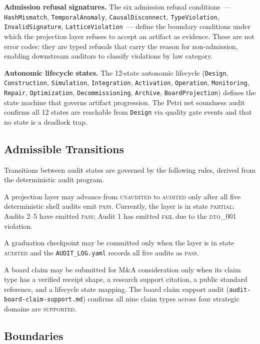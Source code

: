 \textbf{Admission refusal signatures.} The six admission refusal conditions~---
\texttt{HashMismatch}, \texttt{TemporalAnomaly}, \texttt{CausalDisconnect},
\texttt{TypeViolation}, \texttt{InvalidSignature}, \texttt{LatticeViolation}~---
define the boundary conditions under which the projection layer refuses to accept
an artifact as evidence. These are not error codes: they are typed refusals that
carry the reason for non-admission, enabling downstream auditors to classify
violations by law category.

\textbf{Autonomic lifecycle states.} The 12-state autonomic lifecycle
(\texttt{Design}, \texttt{Construction}, \texttt{Simulation},
\texttt{Integration}, \texttt{Activation}, \texttt{Operation},
\texttt{Monitoring}, \texttt{Repair}, \texttt{Optimization},
\texttt{Decommissioning}, \texttt{Archive}, \texttt{BoardProjection}) defines the
state machine that governs artifact progression. The Petri net soundness audit
confirms all 12 states are reachable from \texttt{Design} via quality gate events
and that no state is a deadlock trap.

\subsection{Admissible Transitions}
\label{sec:audits-arch-transitions}

Transitions between audit states are governed by the following rules, derived
from the deterministic audit program.

A projection layer may advance from \textsc{unaudited} to \textsc{audited} only
after all five deterministic shell audits emit \textsc{pass}. Currently, the
layer is in state \textsc{partial}: Audits 2--5 have emitted \textsc{pass}; Audit
1 has emitted \textsc{fail} due to the \textsc{dto\_001} violation.

A graduation checkpoint may be committed only when the layer is in state
\textsc{audited} and the \texttt{AUDIT\_LOG.yaml} records all five audits as
\textsc{pass}.

A board claim may be submitted for M\&A consideration only when its claim type
has a verified receipt shape, a research support citation, a public standard
reference, and a lifecycle state mapping. The board claim support audit
(\texttt{audit-board-claim-support.md}) confirms all nine claim types across
four strategic domains are \textsc{supported}.

\subsection{Boundaries}
\label{sec:audits-arch-boundaries}

